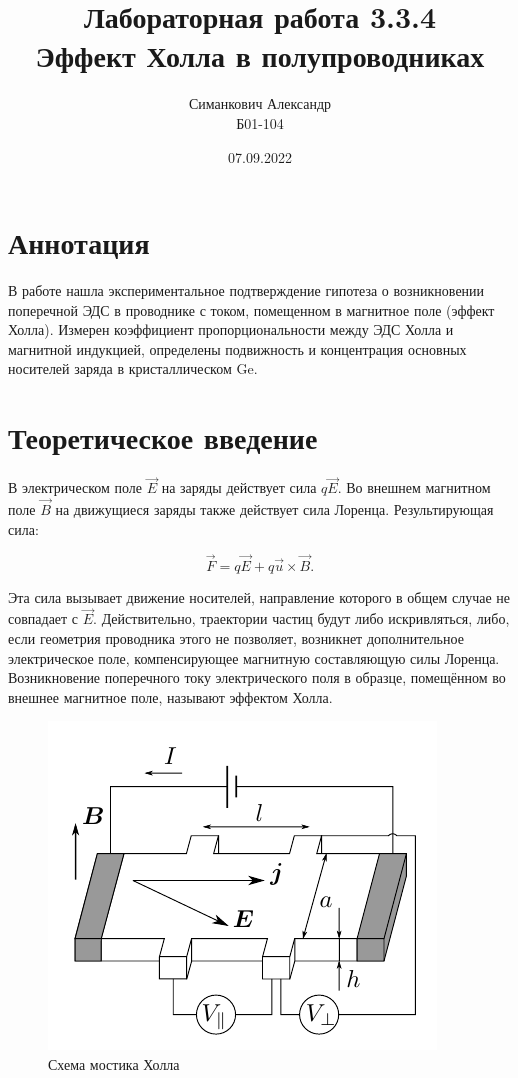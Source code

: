 \documentclass[12pt,a4paper]{article}
\title{Лабораторная работа 3.3.4\\ Эффект Холла в полупроводниках}
\author{Симанкович Александр \\ Б01-104}
\date{07.09.2022}
\begin{document}
	\maketitle
	
	\section*{Аннотация}
	
	В работе нашла экспериментальное подтверждение гипотеза о возникновении поперечной ЭДС в проводнике с током, помещенном в магнитное поле (эффект Холла). Измерен коэффициент пропорциональности между ЭДС Холла и магнитной индукцией, определены подвижность и концентрация основных носителей заряда в кристаллическом Ge.
		
	\section*{Теоретическое введение}
	
	В электрическом поле $\vec{E}$ на заряды действует сила $q\vec{E}$. Во внешнем магнитном поле $\vec{B}$ на движущиеся заряды также действует сила Лоренца. Результирующая сила:
	
	$$ \vec{F} = q\vec{E} + q\vec{u} \times \vec{B}.$$
	
	Эта сила вызывает движение носителей, направление которого в общем случае не совпадает с $\vec{E}$. Действительно, траектории частиц будут ли­бо искривляться, либо, если геометрия проводника этого не позволя­ет, возникнет дополнительное электрическое поле, компенсирующее маг­нитную составляющую силы Лоренца. Возникновение поперечного току электрического поля в образце, помещённом во внешнее магнитное поле, называют эффектом Холла.
	
	\begin{figure}[h]
		\includegraphics[scale=0.65]{res/scheme_hall.png}
		\caption{Схема мостика Холла}
		\label{scheme_hall}
	\end{figure}
\end{document}
